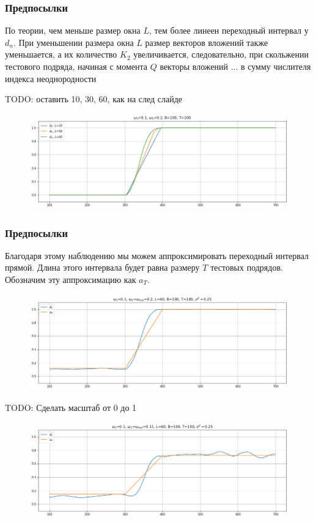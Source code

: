 \documentclass[11pt]{beamer}
\begin{document}
	\begin{frame}
		\frametitle{Предпосылки}
		По теории, чем меньше размер окна $ L $, тем более линеен переходный интервал у $ d_n $. При уменьшении размера окна $ L $ размер векторов вложений также уменьшается, а их количество $ K_2 $ увеличивается, следовательно, при скольжении тестового подряда, начиная с момента $ Q $ векторы вложений ... в сумму числителя индекса неоднородности 
		
		TODO: оставить 10, 30, 60, как на след слайде
		\begin{figure}[b]
			\centering
			\includegraphics[width=0.8\linewidth]{imgs/row_linear_growth}
		\end{figure}
	\end{frame}

	\begin{frame}
		\frametitle{Предпосылки}
		Благодаря этому наблюдению мы можем аппроксимировать переходный интервал прямой. Длина этого интервала будет равна размеру $ T $ тестовых подрядов. Обозначим эту аппроксимацию как $ a_{T} $.
		
		\begin{figure}[b]
			\centering
			\includegraphics[width=0.65\linewidth]{imgs/row_linear_approximation_1}
		\end{figure}
	
		TODO: Сделать масштаб от 0 до 1
		\begin{figure}[b]
			\centering
			\includegraphics[width=0.65\linewidth]{imgs/row_linear_approximation_2}
		\end{figure}
	\end{frame}
\end{document}
